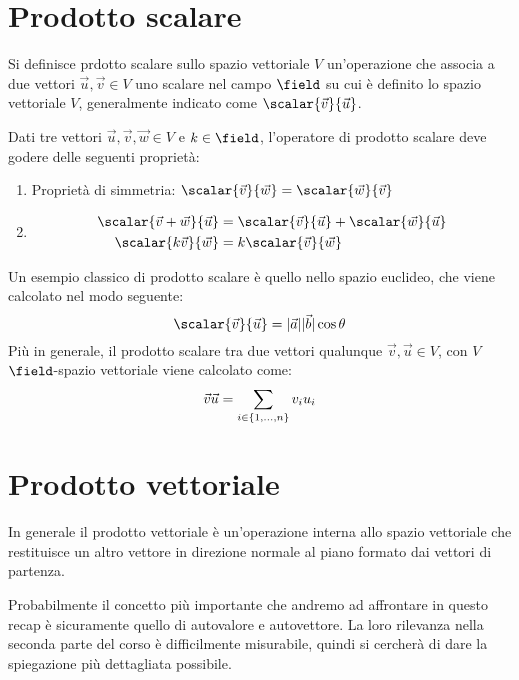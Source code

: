 \section{Prodotto scalare}
Si definisce prdotto scalare sullo spazio vettoriale $V$ un'operazione che associa a due vettori $\vec{u}, \vec{v} \in V$ uno scalare nel campo $\field$ su cui è definito lo spazio vettoriale $V$, generalmente indicato come $\scalar{\vec{v}}{\vec{u}}$.

Dati tre vettori $\vec{u}, \vec{v}, \vec{w} \in V$ e $k \in \field$, l'operatore di prodotto scalare deve godere delle seguenti proprietà:
\begin{enumerate}
    \renewcommand{\labelenumi}{(P\arabic{enumi})}
    \item Proprietà di simmetria: $\scalar{\vec{v}}{\vec{w}} = \scalar{\vec{w}}{\vec{v}}$
    \item 
    \begin{align*}
        \scalar{\vec{v} + \vec{w}}{\vec{u}} &= \scalar{\vec{v}}{\vec{u}} + \scalar{\vec{w}}{\vec{u}} \\ 
        \scalar{k\vec{v}}{\vec{w}} &= k\scalar{\vec{v}}{\vec{w}}
    \end{align*}
\end{enumerate}
Un esempio classico di prodotto scalare è quello nello spazio euclideo, che viene calcolato nel modo seguente:
\begin{equation*}
    \scalar{\vec{v}}{\vec{u}} = |\vec{a}| |\vec{b}| \cos{\theta}
\end{equation*}
Più in generale, il prodotto scalare tra due vettori qualunque $\vec{v}, \vec{u} \in V$, con $V$ $\field$-spazio vettoriale viene calcolato come:
\begin{equation*}
    \scantokens{\vec{v}}{\vec{u}} = \sum_{i \in \{1, \dots, n\}} v_iu_i
\end{equation*}
\section{Prodotto vettoriale}
In generale il prodotto vettoriale è un'operazione interna allo spazio vettoriale che restituisce un altro vettore in direzione normale al piano formato dai vettori di partenza.

\bigbreak
Probabilmente il concetto più importante che andremo ad affrontare in questo recap è sicuramente quello di autovalore e autovettore. La loro rilevanza nella seconda parte del corso è difficilmente misurabile, quindi si cercherà di dare la spiegazione più dettagliata possibile.
